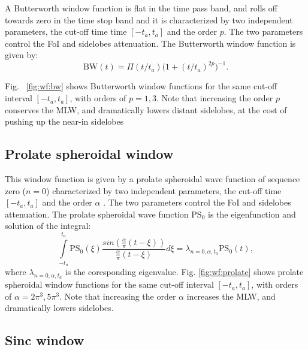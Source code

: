 \documentclass[useAMS,usenatbib]{mn2e}
\begin{document}

A Butterworth window function is flat in the time pass band, and rolls off towards zero in the time stop band and it is 
characterized by two independent parameters, the cut-off time time $[-t_a,t_a]$ and the order $p$. 
The two parameters control the 
FoI and sidelobes attenuation. The Butterworth window function is given by:
\begin{equation}
\mathrm{BW}(t)= \Pi(t/t_a) \Big(1 + (t/t_a)^{2p}\Big)^{-1}.
\end{equation}

Fig.~ \ref{fig:wf:bw} shows Butterworth window functions for the same cut-off interval 
$[-t_a,t_a]$, with orders of $p=1,3$. Note that increasing 
the order $p$ conserves the MLW, and dramatically lowers distant sidelobes, at the cost of pushing up the near-in sidelobes

\subsection{Prolate spheroidal window}


This window function is given by a prolate spheroidal wave function of sequence zero ($n=0$) characterized
by two independent parameters, the cut-off time $[-t_a,t_a]$ and the order $\alpha$ 
\citep{delsarte1985discrete, walter2006prolate}. 
The two parameters control the  FoI and sidelobes attenuation.
The prolate spheroidal wave function $\mathrm{PS}_0$ is the eigenfunction and solution of the integral:
\begin{equation}
\int\limits_{-t_a}^{t_a} \mathrm{PS}_{0}(\xi) \frac{sin(\frac{\alpha}{\pi}(t-\xi))}{\frac{\alpha}{\pi}(t-\xi)}d\xi=\lambda_{n=0,\alpha,t_a}\mathrm{PS}_{0}(t), 
\end{equation}
where $\lambda_{n=0,\alpha,t_a}$ is the coresponding eigenvalue. Fig. \ref{fig:wf:prolate} shows prolate 
spheroidal window functions for the same cut-off interval $[-t_a,t_a]$, with orders of $\alpha=2\pi^3, 5\pi^3$. 
Note that increasing the order $\alpha$ increases the MLW, and dramatically lowers sidelobes.

\subsection{Sinc window}
\end{document}
